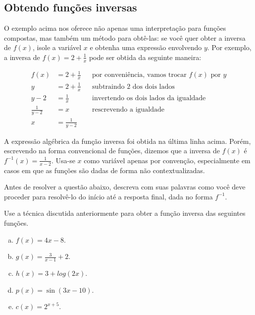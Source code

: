 \documentclass[main.tex]{subfiles}
\begin{document}
\subsection*{Obtendo funções inversas}

O exemplo acima nos oferece não apenas uma interpretação para funções compostas, mas também um método para obtê-las: se você quer obter a inversa de $f(x)$, isole a variável $x$ e obtenha uma expressão envolvendo $y$. Por exemplo, a inversa de $f(x)=2+\frac{1}{x}$ pode ser obtida da seguinte maneira:

\begin{align*}
 f(x) &=2+\frac{1}{x} && \text{por conveniência, vamos trocar } f(x) \text{ por } y \\
 y &= 2+\frac{1}{x} && \text{subtraindo 2 dos dois lados}\\ 
 y-2 &= \frac{1}{x}  && \text{invertendo os dois lados da igualdade}\\
 \frac{1}{y-2} &= x && \text{rescrevendo a igualdade}\\
 x &= \frac{1}{y-2}
\end{align*}

A expressão algébrica da função inversa foi obtida na última linha acima. Porém, escrevendo na forma convencional de funções, dizemos que a inversa de $f(x)$ é $f^{-1}(x)=\frac{1}{x-2}$. Usa-se $x$ como variável apenas por convenção, especialmente em casos em que as funções são dadas de forma não contextualizadas.

\begin{reflita}
Antes de resolver a questão abaixo, descreva com suas palavras como você deve proceder para resolvê-lo do início até a resposta final, dada no forma $f^{-1}$. 
\end{reflita}


\begin{questao}
Use a técnica discutida anteriormente para obter a função inversa das seguintes funções.
\begin{enumerate}[a)]
\item $f(x)=4x-8$.
\item $g(x)=\frac{3}{x-1}+2$.
\item $h(x)=3+log(2x)$.
\item $p(x)=\sin(3x-10)$.
\item $c(x)=2^{x+5}$.
\end{enumerate}
\end{questao}
\end{document}
